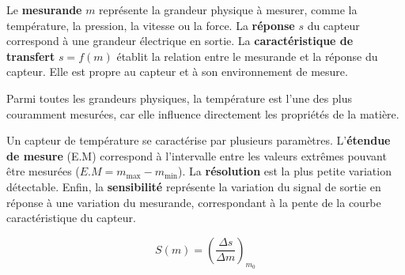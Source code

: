 Le \textbf{mesurande} \( m \) représente la grandeur physique à mesurer, comme la
température, la pression, la vitesse ou la force. La \textbf{réponse} \( s \) 
du capteur correspond à une grandeur électrique en sortie. La \textbf{caractéristique de transfert} 
\( s = f(m) \) établit la relation entre le mesurande et la réponse du capteur.
Elle est propre au capteur et à son environnement de mesure.\par
Parmi toutes les grandeurs physiques, la température est l'une des plus couramment
mesurées, car elle influence directement les propriétés de la matière.

Un capteur de température se caractérise par plusieurs paramètres. 
L'\textbf{étendue de mesure} (E.M) correspond à l'intervalle entre les valeurs 
extrêmes pouvant être mesurées (\( E.M = m_{\max} - m_{\min} \)). La 
\textbf{résolution} est la plus petite variation détectable. Enfin, la 
\textbf{sensibilité} représente la variation du signal de sortie en réponse à 
une variation du mesurande, correspondant à la pente de la courbe caractéristique 
du capteur.

\begin{minipage}{0.3\textwidth}
    \[
        S(m) = \left(\frac{\Delta s}{\Delta m}\right)_{m_0}
    \]
\end{minipage}
\begin{minipage}{0.69\textwidth}
    \label{fig:sensibilite}
\end{minipage}

